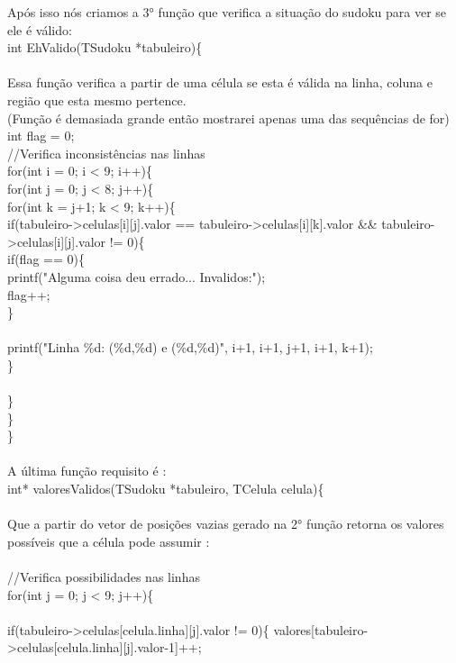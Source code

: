 \documentclass{article}
\begin{document}
Após isso nós criamos a 3° função que verifica a situação do sudoku para ver se ele é válido:\\
int EhValido(TSudoku *tabuleiro)\{\\
\\
Essa função verifica a partir de uma célula se esta é válida na linha, coluna e região que esta mesmo pertence.
\\
(Função é demasiada grande então mostrarei apenas uma das sequências de for)\\
int flag = 0;\\
    //Verifica inconsistências nas linhas\\
    for(int i = 0; i < 9; i++)\{\\
        for(int j = 0; j < 8; j++)\{\\
            for(int k = j+1; k < 9; k++)\{\\
                if(tabuleiro->celulas[i][j].valor == tabuleiro->celulas[i][k].valor && tabuleiro->celulas[i][j].valor != 0)\{\\
                    if(flag == 0)\{\\
                        printf("Alguma coisa deu errado... Invalidos:\n");\\
                        flag++;\\
                    \}\\
 \\
                    printf("Linha \%d: (\%d,\%d) e (\%d,\%d)\n", i+1, i+1, j+1, i+1, k+1);\\
                \}\\
               \\
           \}\\
        \}\\
    \}\\
\\A última função requisito é :\\
int* valoresValidos(TSudoku *tabuleiro, TCelula celula)\{\\
\\
Que a partir do vetor de posições vazias gerado na 2° função retorna os valores possíveis que a célula pode assumir :
\\\\//Verifica possibilidades nas linhas\\
    for(int j = 0; j < 9; j++)\{\\
           \\
        if(tabuleiro->celulas[celula.linha][j].valor != 0)\{
            valores[tabuleiro->celulas[celula.linha][j].valor-1]++;\\
\end{document}
